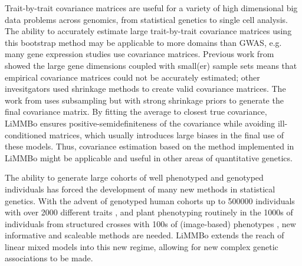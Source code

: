 Trait-by-trait covariance matrices are useful for a variety of high dimensional big data problems across genomics, from statistical genetics to single cell analysis. The ability to accurately estimate large trait-by-trait covariance matrices using this bootstrap method may be applicable to more domains than GWAS, e.g. many gene expression studies use covariance matrices. Previous work from \citet{Schaefer2005} showed the large gene dimensions coupled with small(er) sample sets means that empirical covariance matrices could not be accurately estimated; other invesitgators \citep{Ledoit2004,Furrer2007,Bickel2008} used shrinkage methods to create valid covariance matrices. The work from \citet{Teng2009} uses subsampling but with strong shrinkage priors to generate the final covariance matrix. By fitting the average to closest true covariance, LiMMBo ensures positive-semidefiniteness of the covariance while avoiding ill-conditioned matrices, which usually introduces large biases in the final use of these models. Thus, covariance estimation based on the method implemented in LiMMBo might be applicable and useful in other areas of quantitative genetics.  

The ability to generate large cohorts of well phenotyped and genotyped individuals has forced the development of many new methods in statistical genetics. With the advent of genotyped human cohorts up to \num{500000} individuals with over \num{2000} different traits \citep{Sudlow2015}, and plant phenotyping routinely in the \num{1000}s of individuals from structured crosses with \num{100}s of (image-based) phenotypes \citep{Atwell2010,Yang2014}, new informative and scaleable methods are needed. LiMMBo extends the reach of linear mixed models into this new regime, allowing for new complex genetic associations to be made.
